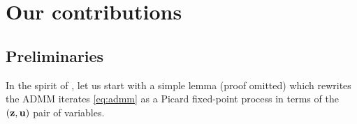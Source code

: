 
\section{Our contributions}
\subsection{Preliminaries}
In the spirit of \citep{ghadimi2013optimal},
let us start with a simple lemma (proof omitted) which
rewrites the ADMM iterates \eqref{eq:admm} as a Picard fixed-point
process in terms of the $(\mathbf{z}, \mathbf{u})$ pair of variables.%

